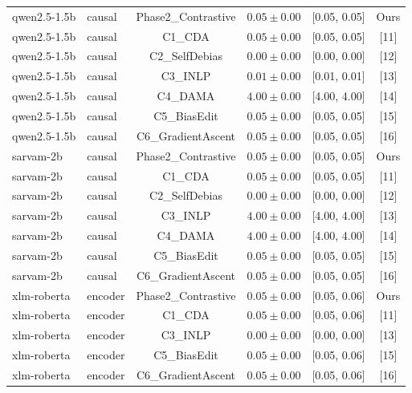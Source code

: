 \begin{table}[t]
\begin{tabular}{llcccc}
\midrule
  qwen2.5-1.5b & causal & Phase2_Contrastive & $0.05 \pm 0.00$ & [0.05, 0.05] & Ours \\
  qwen2.5-1.5b & causal & C1_CDA & $0.05 \pm 0.00$ & [0.05, 0.05] & [11] \\
  qwen2.5-1.5b & causal & C2_SelfDebias & $0.00 \pm 0.00$ & [0.00, 0.00] & [12] \\
  qwen2.5-1.5b & causal & C3_INLP & $0.01 \pm 0.00$ & [0.01, 0.01] & [13] \\
  qwen2.5-1.5b & causal & C4_DAMA & $4.00 \pm 0.00$ & [4.00, 4.00] & [14] \\
  qwen2.5-1.5b & causal & C5_BiasEdit & $0.05 \pm 0.00$ & [0.05, 0.05] & [15] \\
  qwen2.5-1.5b & causal & C6_GradientAscent & $0.05 \pm 0.00$ & [0.05, 0.05] & [16] \\
\midrule
  sarvam-2b & causal & Phase2_Contrastive & $0.05 \pm 0.00$ & [0.05, 0.05] & Ours \\
  sarvam-2b & causal & C1_CDA & $0.05 \pm 0.00$ & [0.05, 0.05] & [11] \\
  sarvam-2b & causal & C2_SelfDebias & $0.00 \pm 0.00$ & [0.00, 0.00] & [12] \\
  sarvam-2b & causal & C3_INLP & $4.00 \pm 0.00$ & [4.00, 4.00] & [13] \\
  sarvam-2b & causal & C4_DAMA & $4.00 \pm 0.00$ & [4.00, 4.00] & [14] \\
  sarvam-2b & causal & C5_BiasEdit & $0.05 \pm 0.00$ & [0.05, 0.05] & [15] \\
  sarvam-2b & causal & C6_GradientAscent & $0.05 \pm 0.00$ & [0.05, 0.05] & [16] \\
\midrule
  xlm-roberta & encoder & Phase2_Contrastive & $0.05 \pm 0.00$ & [0.05, 0.06] & Ours \\
  xlm-roberta & encoder & C1_CDA & $0.05 \pm 0.00$ & [0.05, 0.06] & [11] \\
  xlm-roberta & encoder & C3_INLP & $0.00 \pm 0.00$ & [0.00, 0.00] & [13] \\
  xlm-roberta & encoder & C5_BiasEdit & $0.05 \pm 0.00$ & [0.05, 0.06] & [15] \\
  xlm-roberta & encoder & C6_GradientAscent & $0.05 \pm 0.00$ & [0.05, 0.06] & [16] \\
\bottomrule
\end{tabular}
\end{table}
